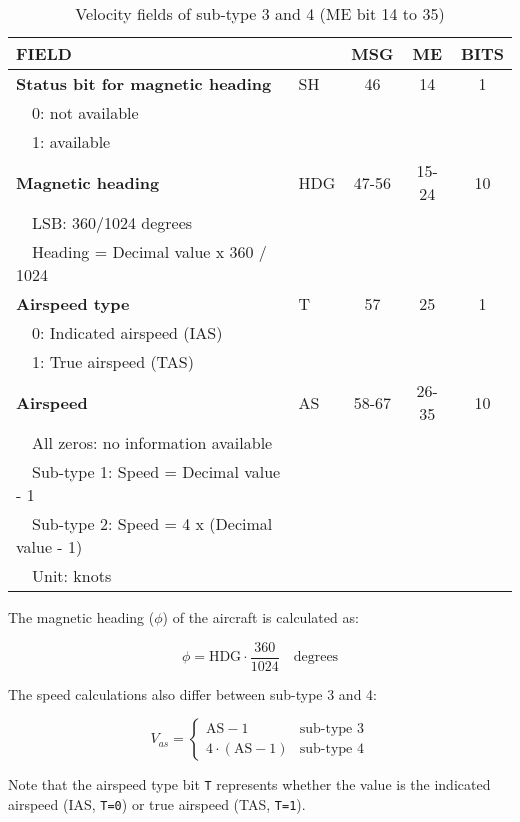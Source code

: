 \begin{table}[ht]
\caption{Velocity fields of sub-type 3 and 4 (ME bit 14 to 35)}
\label{tb:adsb-velocity-bits-14-35-as}
\footnotesize
\begin{tabular}{|l|l|c|c|c|}
\hline
\textbf{FIELD} & & \textbf{MSG} & \textbf{ME} & \textbf{BITS} \\ \hline
\textbf{Status bit for magnetic heading}  & SH & 46 & 14 & 1\\
~~0: not available &&&& \\
~~1: available &&&& \\ \hline
\textbf{Magnetic heading} & HDG & 47-56 & 15-24 & 10 \\
~~LSB: 360/1024 degrees &&&& \\
~~Heading = Decimal value x 360 / 1024 &&&& \\ \hline
\textbf{Airspeed type} & T & 57 & 25 & 1\\
~~0: Indicated airspeed (IAS) &&&& \\
~~1: True airspeed (TAS) &&&& \\ \hline
\textbf{Airspeed} & AS & 58-67 & 26-35 & 10 \\
~~All zeros: no information available &&&& \\
~~Sub-type 1: Speed = Decimal value - 1 &&&& \\
~~Sub-type 2: Speed = 4 x (Decimal value - 1) &&&& \\
~~Unit: knots &&&& \\ \hline
\end{tabular}
\end{table}


The magnetic heading ($\phi$) of the aircraft is calculated as:

\begin{equation}
  \phi = \mathrm{HDG} \cdot \frac{360}{1024}  \quad \text{degrees}
\end{equation}

The speed calculations also differ between sub-type 3 and 4:

\begin{equation}
  V_{as} =
  \begin{cases}
    \mathrm{AS} - 1     & \text{sub-type 3} \\
    4 \cdot (\mathrm{AS} - 1)     & \text{sub-type 4}
  \end{cases}
\end{equation}


Note that the airspeed type bit \texttt{T} represents whether the value is the indicated airspeed (IAS, \texttt{T=0}) or true airspeed (TAS, \texttt{T=1}).

